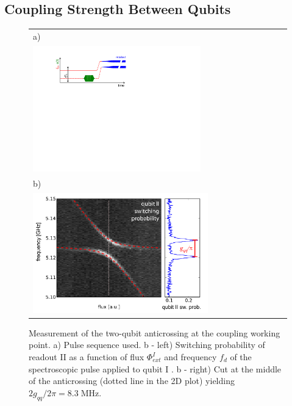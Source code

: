 \subsection{Coupling Strength Between Qubits} \label{section:Coupling_Strength_Between_Qubits}
\begin{figure}[ht!]
	\centering
	\begin{tabular}{l}
	  a) \\
		\includegraphics[width=0.67\textwidth]{"./material/figures/measurement/anticrossing_spectroscopy"} \\
		b) \\
		\includegraphics[width=0.7\textwidth]{"./data/ct5/2011_04_11 - anticrossing/qubit_anticrossing"}
	\end{tabular}
	\caption{ Measurement of the two-qubit anticrossing at the coupling working point. a) Pulse sequence used. b - left) Switching probability of readout II as a function of flux $\Phi_{ext}^I$ and frequency $f_d$ of the spectroscopic pulse applied to qubit I . b - right) Cut at the middle of the anticrossing (dotted line in the 2D plot)  yielding $2g_{qq}/2\pi=8.3\;\mathrm{MHz}$. }
	\label{fig:qubit_anticrossing}
\end{figure}


